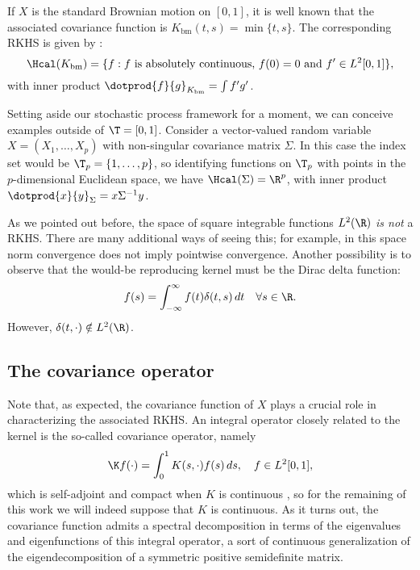 \begin{example}\label{ex:bm}
  If \(X\) is the standard Brownian motion on \([0, 1]\), it is well known that the associated covariance function is \(K_{\text{bm}}(t, s) = \min\{t,s\}\). The corresponding RKHS is given by \citep[][Ex. 8.19]{janson1997gaussian}:
  \[
    \Hcal(K_{\text{bm}}) = \{f: f \text{ is absolutely continuous, } f(0)=0 \text{ and } f'\in L^2[0, 1]\},
  \]
  with inner product \(\dotprod{f}{g}_{K_{\text{bm}}} = \int f'g'\).
\end{example}

\begin{example}
  Setting aside our stochastic process framework for a moment, we can conceive examples outside of \(\T =[0,1]\). Consider a vector-valued random variable \(X = (X_1, \dots, X_p)\) with non-singular covariance matrix \(\Sigma\). In this case the index set would be \(\T_p = \{1,\dots,p\}\), so identifying functions on \(\T_p\) with points in the \(p\)-dimensional Euclidean space, we have \(\Hcal(\Sigma)=\R^p\), with inner product \(\dotprod{x}{y}_\Sigma=x\Sigma^{-1}y\).
\end{example}

\begin{example}
  As we pointed out before, the space of square integrable functions \(L^2(\R)\) \textit{is not} a RKHS. There are many additional ways of seeing this; for example, in this space norm convergence does not imply pointwise convergence. Another possibility is to observe that the would-be reproducing kernel must be the Dirac delta function:
  \[
    f(s) = \int_{-\infty}^\infty f(t)\delta(t, s)\, dt \quad \forall s \in \R.
  \]
  However, \(\delta(t, \cdot) \notin L^2(\R)\).
\end{example}

\subsection*{The covariance operator}

 Note that, as expected, the covariance function of \(X\) plays a crucial role in characterizing the associated RKHS. An integral operator closely related to the kernel is the so-called covariance operator, namely
\[
\K f(\cdot) = \int_0^1 K(s, \cdot)f(s)\, ds, \quad f \in L^2[0, 1],
\]
which is self-adjoint and compact when \(K\) is continuous \citep[e.g.][Th.~4.6.2]{hsing2015theoretical}, so for the remaining of this work we will indeed suppose that \(K\) is continuous. As it turns out, the covariance function admits a spectral decomposition in terms of the eigenvalues and eigenfunctions of this integral operator, a sort of continuous generalization of the eigendecomposition of a symmetric positive semidefinite matrix.

